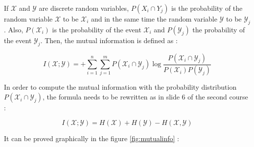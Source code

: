\documentclass[titlepage]{article}
\begin{document}
If $\mathcal{X}$ and $\mathcal{Y}$ are discrete random variables, $P\left(X_i \cap Y_j\right)$ is the probability of the random variable $\mathcal{X}$ to be $\mathcal{X}_i$ and in the same time the random variable $\mathcal{Y}$ to be $\mathcal{Y}_j$. Also, $P(\mathcal{X}_i)$ is the probability of the event $\mathcal{X}_i$ and $P(\mathcal{Y}_j)$ the probability of the event $\mathcal{Y}_j$. Then, the mutual information is defined as : 

$$I(\mathcal{X} ; \mathcal{Y})=+\sum_{i=1}^n \sum_{j=1}^m P\left(\mathcal{X}_i \cap \mathcal{Y}_j\right) \log \frac{P\left(\mathcal{X}_i \cap \mathcal{Y}_j\right)}{P\left(\mathcal{X}_i\right) P\left(\mathcal{Y}_j\right)}$$

In order to compute the mutual information with the probability distribution $P\left(\mathcal{X}_i \cap \mathcal{Y}_j\right)$, the formula needs to be rewritten as in slide 6 of the second course :

$$I(\mathcal{X} ; \mathcal{Y})=H(\mathcal{X})+H(\mathcal{Y})-H(\mathcal{X}, \mathcal{Y})$$

It can be proved graphically in the figure \ref{fig:mutualinfo} : 
\end{document}

